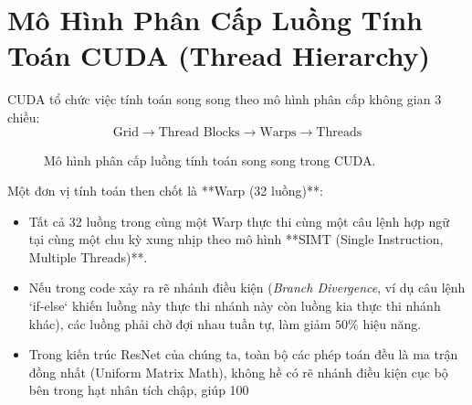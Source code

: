 \documentclass[11pt,a4paper]{report}
\begin{document}
\section{Mô Hình Phân Cấp Luồng Tính Toán CUDA (Thread Hierarchy)}

CUDA tổ chức việc tính toán song song theo mô hình phân cấp không gian 3 chiều:
\begin{equation}
    \text{Grid} \longrightarrow \text{Thread Blocks} \longrightarrow \text{Warps} \longrightarrow \text{Threads}
\end{equation}

\begin{figure}[htbp]
\centering
{}
\caption{Mô hình phân cấp luồng tính toán song song trong CUDA.}
\label{fig:cuda_thread_hierarchy}
\end{figure}

Một đơn vị tính toán then chốt là **Warp (32 luồng)**:
\begin{itemize}
    \item Tất cả 32 luồng trong cùng một Warp thực thi cùng một câu lệnh hợp ngữ tại cùng một chu kỳ xung nhịp theo mô hình **SIMT (Single Instruction, Multiple Threads)**.
    \item Nếu trong code xảy ra rẽ nhánh điều kiện (\textit{Branch Divergence}, ví dụ câu lệnh `if-else` khiến luồng này thực thi nhánh này còn luồng kia thực thi nhánh khác), các luồng phải chờ đợi nhau tuần tự, làm giảm $50\%$ hiệu năng.
    \item Trong kiến trúc ResNet của chúng ta, toàn bộ các phép toán đều là ma trận đồng nhất (Uniform Matrix Math), không hề có rẽ nhánh điều kiện cục bộ bên trong hạt nhân tích chập, giúp 100%
\end{itemize}
\end{document}

